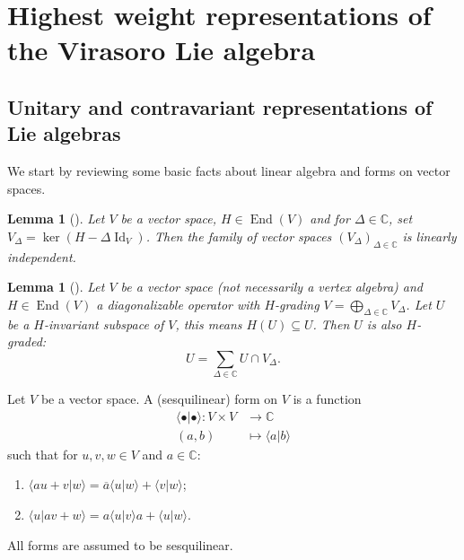 \documentclass[a4paper, 12pt, reqno]{amsart}
\newtheorem{lemma}[theorem]{Lemma}
\theoremstyle{remark}
\numberwithin{equation}{subsection}
\DeclareMathOperator{\Id}{Id}
\DeclareMathOperator{\End}{End}
\begin{document}
\section{Highest weight representations of the Virasoro Lie algebra}
\label{sec:high-weight-repr}

\subsection{Unitary and contravariant representations of Lie algebras}
\label{sec:unit-contr-repr}

We start by reviewing some basic facts about linear algebra and forms on vector spaces.

\begin{lemma}[{\cite[\S6.2]{hoffman_linear_1971}}]
  \label{lmm:6}
  Let $V$ be a vector space, $H \in \End(V)$ and for $\Delta \in \mathbb{C}$, set $V_{\Delta} = \ker(H - \Delta\Id_V)$.
  Then the family of vector spaces $(V_{\Delta})_{\Delta \in \mathbb{C}}$ is linearly independent.
\end{lemma}

\begin{lemma}[{\cite[Corollary 1.1]{kac_bombay_2013}}]
  \label{lmm:7}
  Let $V$ be a vector space (not necessarily a vertex algebra) and $H \in \End(V)$ a diagonalizable operator with $H$-grading $V = \bigoplus_{\Delta \in \mathbb{C}}V_{\Delta}$.
  Let $U$ be a $H$-invariant subspace of $V$, this means $H(U) \subseteq U$.
  Then $U$ is also $H$-graded:
  \begin{equation*}
    U = \sum_{\Delta \in \mathbb{C}}U \cap V_{\Delta}.
  \end{equation*}
\end{lemma}

Let $V$ be a vector space.
A (sesquilinear) form on $V$ is a function
\begin{align*}
  \langle \bullet| \bullet\rangle: V \times V &\to \mathbb{C} \\
  (a, b) &\mapsto \langle a| b\rangle
\end{align*}
such that for $u, v, w \in V$ and $a \in \mathbb{C}$:
\begin{enumerate}
\item $\langle au + v| w\rangle = \overline{a}\langle u| w\rangle + \langle v| w\rangle$;
\item $\langle u| av + w\rangle = a\langle u| v\rangle a + \langle u| w\rangle$.
\end{enumerate}
All forms are assumed to be sesquilinear.
\end{document}
